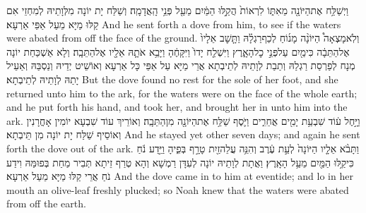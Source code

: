 {וַיְשַׁלַּ֥ח אֶת\maqqaf הַיּוֹנָ֖ה מֵאִתּ֑וֹ לִרְאוֹת֙ הֲקַ֣לּוּ הַמַּ֔יִם מֵעַ֖ל פְּנֵ֥י הָֽאֲדָמָֽה׃}
{וְשַׁלַּח יָת יוֹנָה מִלְּוָתֵיהּ לְמִחְזֵי אִם קַלּוּ מַיָּא מֵעַל אַפֵּי אַרְעָא׃}
{And he sent forth a dove from him, to see if the waters were abated from off the face of the ground.}{}
{וְלֹֽא\maqqaf מָצְאָה֩ הַיּוֹנָ֨ה מָנ֜וֹחַ לְכַף\maqqaf רַגְלָ֗הּ וַתָּ֤שׇׁב אֵלָיו֙ אֶל\maqqaf הַתֵּבָ֔ה כִּי\maqqaf מַ֖יִם עַל\maqqaf פְּנֵ֣י כׇל\maqqaf הָאָ֑רֶץ וַיִּשְׁלַ֤ח יָדוֹ֙ וַיִּקָּחֶ֔הָ וַיָּבֵ֥א אֹתָ֛הּ אֵלָ֖יו אֶל\maqqaf הַתֵּבָֽה׃}
{וְלָא אַשְׁכַּחַת יוֹנָה מְנָח לְפַרְסַת רַגְלַהּ וְתַבַת לְוָתֵיהּ לְתֵיבְתָא אֲרֵי מַיָּא עַל אַפֵּי כָּל אַרְעָא וְאוֹשֵׁיט יְדֵיהּ וְנַסְבַּהּ וְאַעֵיל יָתַהּ לְוָתֵיהּ לְתֵיבְתָא׃}
{But the dove found no rest for the sole of her foot, and she returned unto him to the ark, for the waters were on the face of the whole earth; and he put forth his hand, and took her, and brought her in unto him into the ark.}{}
{וַיָּ֣חֶל ע֔וֹד שִׁבְעַ֥ת יָמִ֖ים אֲחֵרִ֑ים וַיֹּ֛סֶף שַׁלַּ֥ח אֶת\maqqaf הַיּוֹנָ֖ה מִן\maqqaf הַתֵּבָֽה׃}
{וְאוֹרֵיךְ עוֹד שִׁבְעָא יוֹמִין אָחֳרָנִין וְאוֹסֵיף שַׁלַּח יָת יוֹנָה מִן תֵּיבְתָא׃}
{And he stayed yet other seven days; and again he sent forth the dove out of the ark.}{}
{וַתָּבֹ֨א אֵלָ֤יו הַיּוֹנָה֙ לְעֵ֣ת עֶ֔רֶב וְהִנֵּ֥ה עֲלֵה\maqqaf זַ֖יִת טָרָ֣ף בְּפִ֑יהָ וַיֵּ֣דַע נֹ֔חַ כִּי\maqqaf קַ֥לּוּ הַמַּ֖יִם מֵעַ֥ל הָאָֽרֶץ׃}
{וַאֲתָת לְוָתֵיהּ יוֹנָה לְעִדָּן רַמְשָׁא וְהָא טְרַף זֵיתָא תְּבִיר מַחַת בְּפוּמַּהּ וִידַע נֹחַ אֲרֵי קַלּוּ מַיָּא מֵעַל אַרְעָא׃}
{And the dove came in to him at eventide; and lo in her mouth an olive-leaf freshly plucked; so Noah knew that the waters were abated from off the earth.}{}

